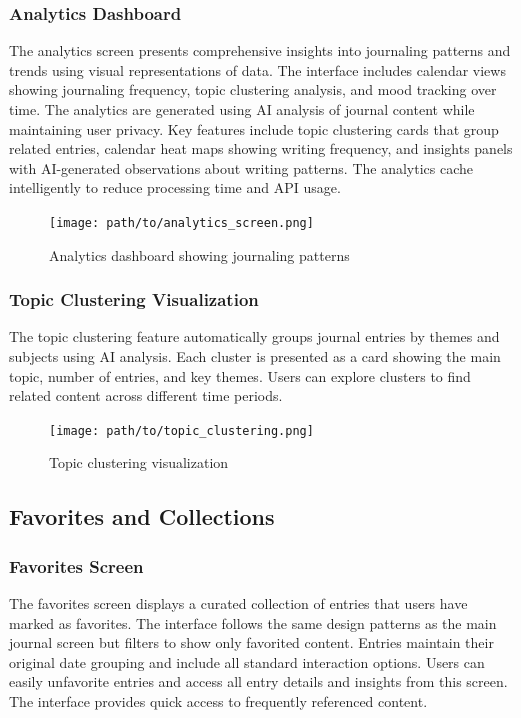 \subsubsection{Analytics Dashboard}

The analytics screen presents comprehensive insights into journaling patterns and trends using visual representations of data. The interface includes calendar views showing journaling frequency, topic clustering analysis, and mood tracking over time. The analytics are generated using AI analysis of journal content while maintaining user privacy. Key features include topic clustering cards that group related entries, calendar heat maps showing writing frequency, and insights panels with AI-generated observations about writing patterns. The analytics cache intelligently to reduce processing time and API usage.

\begin{figure}[H]
\centering
\texttt{[image: path/to/analytics\_screen.png]}
\caption{Analytics dashboard showing journaling patterns}
\label{fig:analytics-screen}
\end{figure}

\subsubsection{Topic Clustering Visualization}

The topic clustering feature automatically groups journal entries by themes and subjects using AI analysis. Each cluster is presented as a card showing the main topic, number of entries, and key themes. Users can explore clusters to find related content across different time periods.

\begin{figure}[H]
\centering
\texttt{[image: path/to/topic\_clustering.png]}
\caption{Topic clustering visualization}
\label{fig:topic-clustering}
\end{figure}

\subsection{Favorites and Collections}

\subsubsection{Favorites Screen}

The favorites screen displays a curated collection of entries that users have marked as favorites. The interface follows the same design patterns as the main journal screen but filters to show only favorited content. Entries maintain their original date grouping and include all standard interaction options. Users can easily unfavorite entries and access all entry details and insights from this screen. The interface provides quick access to frequently referenced content.

